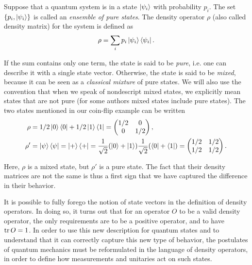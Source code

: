 \begin{definition}
    Suppose that a quantum system is in a state $\ket{\psi_i}$ with probability $p_i$. The set $\{p_i, \ket{\psi_i}\}$ is called an \textit{ensemble of pure states}. The density operator $\rho$ (also called density matrix) for the system is defined as
    \begin{equation}
        \rho = \sum_i p_i \ket{\psi_i}\bra{\psi_i}.
    \end{equation}
\end{definition}

If the sum contains only one term, the state is said to be \textit{pure}, i.e. one can describe it with a single state vector. Otherwise, the state is said to be \textit{mixed}, because it can be seen as a \textit{classical mixture} of pure states. We will also use the convention that when we speak of nondescript mixed states, we explicitly mean states that are not pure (for some authors mixed states include pure states). The two states mentioned in our coin-flip example can be written
\begin{align}
    \rho &= 1/2 \ket{0}\bra{0} + 1/2 \ket{1}\bra{1} = \left(\begin{matrix}
        1/2 & 0\\
        0 & 1/2
    \end{matrix}\right),\\
    \rho' &= \ket{\psi}\bra{\psi} = \ket{+}\bra{+} = \frac{1}{\sqrt{2}}(\ket{0} + \ket{1})\frac{1}{\sqrt{2}}(\bra{0} + \bra{1}) = \left(\begin{matrix}
        1/2 & 1/2\\
        1/2 & 1/2
    \end{matrix}\right).
\end{align}

Here, $\rho$ is a mixed state, but $\rho'$ is a pure state. The fact that their density matrices are not the same is thus a first sign that we have captured the difference in their behavior.

It is possible to fully forego the notion of state vectors in the definition of density operators. In doing so, it turns out that for an operator $O$ to be a valid density operator, the only requirements are to be a positive operator, and to have $\operatorname{tr} O = 1$. In order to use this new description for quantum states and to understand that it can correctly capture this new type of behavior, the postulates of quantum mechanics must be reformulated in the language of density operators, in order to define how measurements and unitaries act on such states.

